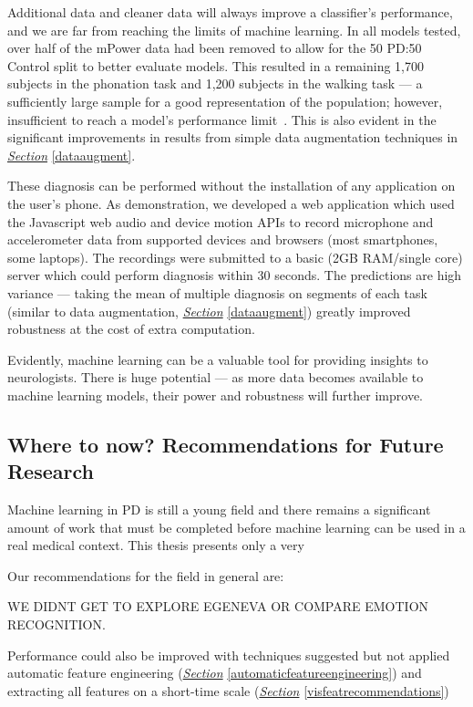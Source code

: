 \documentclass[12pt, twoside]{book}
\begin{document}
Additional data and cleaner data will always improve a classifier's performance, and we are far from reaching the limits of machine learning. In all models tested, over half of the mPower data had been removed to allow for the 50 PD:50 Control split to better evaluate models. This resulted in a remaining 1,700 subjects in the phonation task and 1,200 subjects in the walking task --- a sufficiently large sample for a good representation of the population; however, insufficient to reach a model's performance limit~\cite{cho2015much}. This is also evident in the significant improvements in results from simple data augmentation techniques in \textit{\hyperref[dataaugment]{Section}} \ref{dataaugment}. 


These diagnosis can be performed without the installation of any application on the user's phone. As demonstration, we developed a web application which used the Javascript web audio and device motion APIs to record microphone and accelerometer data from supported devices and browsers (most smartphones, some laptops). The recordings were submitted to a basic (2GB RAM/single core) server which could perform diagnosis within 30 seconds. The predictions are high variance --- taking the mean of multiple diagnosis on segments of each task (similar to data augmentation, \textit{\hyperref[dataaugment]{Section}} \ref{dataaugment}) greatly improved robustness at the cost of extra computation.

Evidently, machine learning can be a valuable tool for providing insights to neurologists. There is huge potential --- as more data becomes available to machine learning models, their power and robustness will further improve. 

\subsection{Where to now? Recommendations for Future Research}


Machine learning in PD is still a young field and there remains a significant amount of work that must be completed before machine learning can be used in a real medical context. This thesis presents only a very 

 Our recommendations for the field in general are:

WE DIDNT GET TO EXPLORE EGENEVA OR COMPARE EMOTION RECOGNITION.



Performance could also be improved with techniques suggested but not applied automatic feature engineering (\textit{\hyperref[automaticfeatureengineering]{Section}} \ref{automaticfeatureengineering}) and extracting all features on a short-time scale (\textit{\hyperref[visfeatrecommendations]{Section}} \ref{visfeatrecommendations}) 
\end{document}
